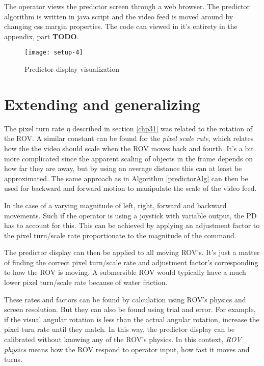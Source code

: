 The operator views the predictor screen through a web browser. The predictor algorithm is written in java script and the video feed is moved around by changing css margin properties. The code can viewed in it's entirety in the appendix, part \textbf{TODO}.

\begin{figure}[h!]
    \centering
    \texttt{[image: setup-4]}
    \caption{Predictor display visualization}
    \label{predictorvis}
\end{figure}

\section{Extending and generalizing}\label{expand}

The pixel turn rate $\eta$ described in section \ref{chp31} was related to the rotation of the ROV. A similar constant can be found for the \emph{pixel scale rate}, which relates how the the video should scale when the ROV moves back and fourth. It's a bit more complicated since the apparent scaling of objects in the frame depends on how far they are away, but by using an average distance this can at least be approximated. The same approach as in Algorithm \ref{predictorAlg} can then be used for backward and forward motion to manipulate the scale of the video feed.

In the case of a varying magnitude of left, right, forward and backward movements. Such if the operator is using a joystick with variable output, the PD has to account for this. This can be achieved by applying an adjustment factor to the pixel turn/scale rate proportionate to the magnitude of the command.

The predictor display can then be applied to all moving ROV's. It's just a matter of finding the correct pixel turn/scale rate and adjustment factor's corresponding to how the ROV is moving. A submersible ROV would typically have a much lower pixel turn/scale rate because of water friction.

These rates and factors can be found by calculation using ROV's physics and screen resolution. But they can also be found using trial and error. For example, if the visual angular rotation is less than the actual angular rotation, increase the pixel turn rate until they match. In this way, the predictor display can be calibrated without knowing any of the ROV's physics. In this context, \emph{ROV physics} means how the ROV respond to operator input, how fast it moves and turns.